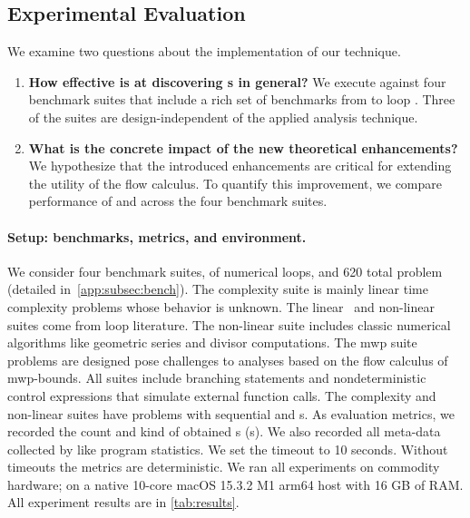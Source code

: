 \subsection{Experimental Evaluation}
\label{sec:performance}

We examine two questions about the implementation of our technique.

\begin{enumerate}

    \item \textbf{How effective is \ndx{\impl} at discovering
    s in general?}
    We execute \ndx{\impl} against four benchmark suites that include a rich set
    of benchmarks from  to loop
    . Three of the suites are design-independent of the
    applied analysis technique.

    \item \textbf{What is the concrete impact of the new theoretical
    enhancements?}
    We hypothesize that the introduced enhancements are critical for extending
    the utility of the flow calculus. To quantify this
    improvement, we compare performance of \ndx{\impl} and \ndx{\impf} across
    the four benchmark suites.

\end{enumerate}

\paragraph*{Setup: benchmarks, metrics, and environment.}
\label{subsec:exp-setup}
We consider four benchmark suites, of numerical  loops, and 620 total problem (detailed in~\autoref{app:subsec:bench}). The
{complexity} suite is mainly linear time complexity problems whose
 behavior is unknown. The
{linear}~\cite{si2018} and
{non-linear}~\cite{nguyen2017,yu2023} suites come
from loop  literature. The
non-linear suite includes classic numerical algorithms like geometric series and
divisor computations. The {mwp} suite~\cite{aubert2023b} problems are designed
pose challenges to analyses based on the flow calculus of
mwp-bounds. All suites include branching statements and
nondeterministic control expressions that simulate
external function calls. The complexity and non-linear suites have problems with
sequential and s. As evaluation metrics, we recorded the count
and kind of obtained s (\ie {}s). We also
recorded all meta-data collected by  like program statistics. We set
the timeout to 10 seconds. Without timeouts the metrics are deterministic. We
ran all experiments on commodity hardware; on a native 10-core macOS 15.3.2 M1
arm64 host with 16 GB of RAM\@. All experiment results are in
\autoref{tab:results}.

